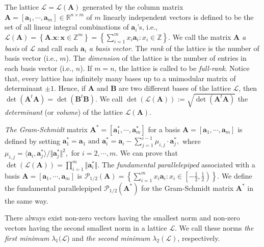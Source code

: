 \documentclass{cta-author}
\begin{document}
The lattice $\mathcal{L}=\mathcal{L}(\mathbf{A})$ generated by the column matrix $\mathbf{A}=[\mathbf{a}_1,\cdots,\mathbf{a}_{m} ] \in \mathbb{R}^{n \times m}$ of $m$ linearly independent vectors is defined to be the set of all linear integral combinations of $\mathbf{a}_{i}$'s, i.e., 
$\mathcal{L}(\mathbf{A})=\left\{ \mathbf{A}.\mathbf{x}: \mathbf{x} \in \mathbb{Z}^{m}\right\}=\left\{ \sum_{i=1}^{m} x_i\mathbf{a}_i: x_i \in \mathbb{Z}\right\}.  $
We call the matrix $\mathbf{A}$ \textit{a basis} of $\mathcal{L}$ and call each $\mathbf{a}_i$ \textit{a basis vector}. The \textit{rank} of the lattice is the number of basis vector (i.e., $m$). The \textit{dimension} of the lattice is the number of entries in each basis vector (i.e., $n$). If $m=n$, the lattice is called to be \textit{full-rank}. Notice that, every lattice has infinitely many bases up to a unimodular matrix of determinant $\pm1$. Hence, if $\mathbf{A}$ and $\mathbf{B}$ are two different bases of the lattice $\mathcal{L}$, then $\det (\mathbf{A}^t \mathbf{A})=\det (\mathbf{B}^t \mathbf{B})$. We call $\det(\mathcal{L}(\mathbf{A})):=\sqrt{\det (\mathbf{A}^t \mathbf{A})}$ the \textit{determinant} (or \textit{volume}) of the lattice $\mathcal{L(\mathbf{A})}.$ 

\textit{The Gram-Schmidt} matrix $\mathbf{A}^{*}=[\mathbf{a}^{*}_1,\cdots,\mathbf{a}^{*}_{m} ]$ for a basis $\mathbf{A}=[\mathbf{a}_1,\cdots,\mathbf{a}_{m} ]$ is defined by setting
$\mathbf{a}^{*}_1=\mathbf{a}_1\text{ and } \mathbf{a}^{*}_{i}=\mathbf{a}_{i}-\sum_{j=1}^{i-1} \mu_{i,j}\cdot \mathbf{a}^{*}_j,$ where $\mu_{i, j}=\langle \mathbf{a}_{i}, \mathbf{a}^{*}_j \rangle/\Vert\mathbf{a}^{*}_j\Vert^2,$ for $i=2,\cdots,m.$  We can prove that $\det(\mathcal{L}{(\mathbf{A})})=\prod_{i=1}^{m}\Vert \mathbf{a}_i^* \Vert.$
The \textit{fundamental parallelepiped} associated with a basis $\mathbf{A}=[\mathbf{a}_1,\cdots,\mathbf{a}_{m}]$ is $\mathcal{P}_{1/2}(\mathbf{A})=\left\{ \sum_{i=1}^{m} x_i\mathbf{a}_i: x_i \in \left[-\frac{1}{2},\frac{1}{2} \right)\right\}. $ We define the fundamental parallelepiped $\mathcal{P}_{1/2}(\mathbf{A}^{*})$ for the Gram-Schmidt matrix $\mathbf{A}^{*}$ in the same way. 

There always exist non-zero vectors having the smallest norm and non-zero vectors having the second smallest norm in a lattice $\mathcal{L}$. We call these norms \textit{the first minimum} $\lambda_1(\mathcal{L}
$) and \textit{the second minimum} $\lambda_2(\mathcal{L})
$, respectively. 
\end{document}
